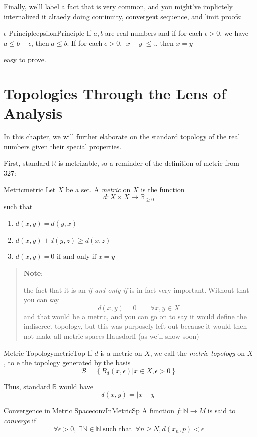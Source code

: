 \documentclass{book}
\newcommand{\N}{{\mathbb{N}}}
\newcommand{\R}{{\mathbb{R}}}
\newcommand{\CB}{{\mathcal{B}}}
\renewcommand{\mid}{\big|}
\newcommand{\rw}{\rightarrow}
\newenvironment{note}
 {\begin{tcolorbox}[enhanced, sharp corners, colback=white , borderline={0.2pt}{0pt}{black}]
   \begin{quote}\textbf{Note}:
   }{
   \end{quote}\end{tcolorbox}}
\newenvironment{Proof}[1][]
  {\begin{ProofTcb}[#1]}
  {\end{ProofTcb}}
\begin{document}
Finally, we'll label a fact that is very common, and you might've implictely internalized it alraedy doing
continuity, convergent sequence, and limit proofs:

\begin{thm}{$\epsilon$ Principle}{epsilonPrinciple}
	If $a,b$ are real numbers and if for each $\epsilon > 0$, we have $a \le b + \epsilon$, then $a \le b$. If for each
	$\epsilon > 0$, $|x-y| \le \epsilon$, then $x = y$
\end{thm}

\begin{Proof}
	easy to prove.
\end{Proof}

\chapter{Topologies Through the Lens of Analysis}

In this chapter, we will further elaborate on the standard topology of the real numbers given their special properties.

First, standard $\R$ is metrizable, so a reminder of the definition of metric from 327:

\begin{defn}{Metric}{metric}
	Let $X$ be a set. A \emph{metric} on $X$ is the function
	\[
		d: X \times X \rw \R_{\ge 0}
	\]
	such that
	\begin{enumerate}
		\item $d(x,y) = d(y,x)$
		\item $d(x,y) + d(y,z) \ge d(x,z)$
		\item $d(x,y) = 0 \text{ if and only if } x = y$
	\end{enumerate}
\end{defn}

\begin{note}
	the fact that it is an \emph{if and only if} is in fact very important. Without that you can say
	\[
		d(x,y) = 0 \qquad \forall x,y \in X
	\]
	and that would be a metric, and you can go on to say it would define the indiscreet topology, but this was purposely
	left out because it would then not make all metric spaces Hausdorff (as we'll show soon)
\end{note}
\begin{defn}{Metric Topology}{metricTop}
	If $d$ is a metric on $X$, we call the \emph{metric topology} on $X$, to e the topology generated by the basis
	\[
		\CB = \left\{ B_d(x,\epsilon) \mid x\in X, \epsilon > 0 \right\}
	\]
\end{defn}
Thus, standard $\R$ would have
\[
	d(x,y) = |x-y|
\]
\begin{defn}{Convergence in Metric Space}{convInMetricSp}
	A function $f: \N \rw M$ is said to \emph{converge} if
	\[
		\forall \epsilon > 0,\ \exists \N \in \N \text{ such that }\ \forall n \ge N, d(x_n, p) < \epsilon
	\]
\end{defn}
\end{document}
